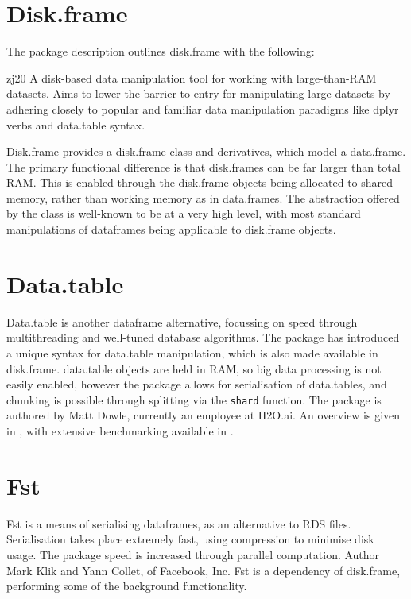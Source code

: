 \documentclass[10pt,a4paper]{article}
\begin{document}
\section{Disk.frame}
\label{sec:disk.frame}

The package description outlines disk.frame with the following:

\begin{displaycquote}{zj20}
  A disk-based data manipulation tool for working with large-than-RAM
  datasets. Aims to lower the barrier-to-entry for manipulating large
  datasets by adhering closely to popular and familiar data
  manipulation paradigms like dplyr verbs and data.table syntax.
\end{displaycquote}

Disk.frame provides a disk.frame class and derivatives, which model a
data.frame. The primary functional difference is that disk.frames can
be far larger than total RAM. This is enabled through the disk.frame
objects being allocated to shared memory, rather than working memory
as in data.frames. The abstraction offered by the class is well-known
to be at a very high level, with most standard manipulations of
dataframes being applicable to disk.frame objects.

\section{Data.table}
\label{sec:data.table}

Data.table is another dataframe alternative, focussing on speed
through multithreading and well-tuned database
algorithms\cite{dowle19}. The package has introduced a unique syntax
for data.table manipulation, which is also made available in
disk.frame. data.table objects are held in RAM, so big data processing
is not easily enabled, however the package allows for serialisation of
data.tables, and chunking is possible through splitting via the
\texttt{shard} function. The package is authored by Matt Dowle,
currently an employee at H2O.ai. An overview is given in
\textcite{dowle19:_introd}, with extensive benchmarking available in
\textcite{dowle19:_bench}.

\section{Fst}
\label{sec:fst}

Fst is a means of serialising dataframes, as an alternative to RDS
files\cite{klik19}. Serialisation takes place extremely fast, using compression to
minimise disk usage. The package speed is increased through parallel
computation. Author Mark Klik and Yann Collet, of Facebook, Inc. Fst
is a dependency of disk.frame, performing some of the background
functionality.
\end{document}
